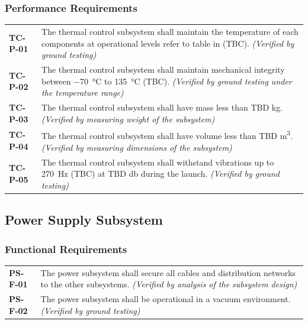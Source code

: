 \documentclass[12pt, letterpaper]{article}
\begin{document}
\subsubsection*{Performance Requirements}
\vspace{-20pt}
\begin{longtable}{P{2cm}P{13.75cm}}
\textbf{TC-P-01}	&
The thermal control subsystem shall maintain the temperature of each components at operational levels refer to table in  (TBC).
\textit{(Verified by ground testing)}	\\
\textbf{TC-P-02}	&
The thermal control subsystem shall maintain mechanical integrity between \SI{-70}{\degreeCelsius} to \SI{135}{\degreeCelsius} (TBC).
\textit{(Verified by ground testing under the temperature range)}		\\
\textbf{TC-P-03}	&
The thermal control subsystem shall have mass less than TBD \si{\kilo\gram}.
\textit{(Verified by measuring weight of the subsystem)}	\\
\textbf{TC-P-04}	&
The thermal control subsystem shall have volume less than TBD \si{\metre\cubed}.
\textit{(Verified by measuring dimensions of the subsystem)}	\\
\textbf{TC-P-05}	&
The thermal control subsystem shall withstand vibrations up to \SI{270}{\hertz} (TBC) at TBD \si{\decibel} during the launch.
\textit{(Verified by ground testing)}	\\
\end{longtable}

\subsection{Power Supply Subsystem}
\label{sect:power}
\subsubsection*{Functional Requirements}
\vspace{-20pt}
\begin{longtable}{P{2cm}P{13.75cm}}
\textbf{PS-F-01}	&
The power subsystem shall secure all cables and distribution networks to the other subsystems.
\textit{(Verified by analysis of the subsystem design)}	\\
\textbf{PS-F-02}	&
The power subsystem shall be operational in a vacuum environment.
\textit{(Verified by ground testing)}	\\
\end{longtable}
\end{document}
